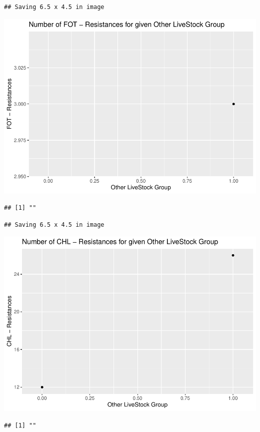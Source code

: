 \documentclass[
]{article}
\begin{document}
\begin{verbatim}
## Saving 6.5 x 4.5 in image
\end{verbatim}

\includegraphics{NResistenzen_files/figure-latex/binary_or_nominal_variables-15.pdf}

\begin{verbatim}
## [1] ""
\end{verbatim}

\begin{verbatim}
## Saving 6.5 x 4.5 in image
\end{verbatim}

\includegraphics{NResistenzen_files/figure-latex/binary_or_nominal_variables-16.pdf}

\begin{verbatim}
## [1] ""
\end{verbatim}
\end{document}
